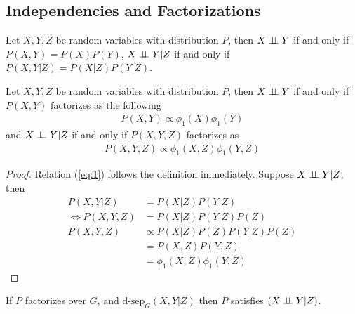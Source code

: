 \documentclass[11pt]{article}
\newcommand{\dsep}[0]{\text{d-sep}}
\newcommand{\pa}[0]{\text{Par}}
\begin{document}
	\subsection{Independencies and Factorizations}
	\begin{definition}
		Let $X, Y, Z$ be random variables with distribution $P$, then $X \perp \!\!\! \perp Y$ if and only if $P(X, Y) = P(X)P(Y)$, $X \perp \!\!\! \perp Y | Z$ if and only if $P(X, Y|Z) = P(X|Z)P(Y|Z)$.
	\end{definition}
	
	\begin{proposition}
		Let $X, Y, Z$ be random variables with distribution $P$, then $X \perp \!\!\! \perp Y$ if and only if $P(X,Y)$ factorizes as the following
		\begin{align}
			P(X, Y) \propto \phi_1(X) \phi_1(Y) \label{eq:1}
		\end{align}
		and $X \perp \!\!\! \perp Y|Z$ if and only if $P(X, Y, Z)$ factorizes as
		\begin{align}
			P(X, Y, Z) \propto \phi_1(X, Z) \phi_1(Y, Z) \label{eq:2}
		\end{align}
		
		\begin{proof}
			Relation (\ref{eq:1}) follows the definition immediately.
			Suppose $X \perp \!\!\! \perp Y|Z$, then
			\begin{align}
				P(X, Y | Z) &= P(X|Z)P(Y|Z) \\
				\iff P(X,Y,Z) &= P(X|Z)P(Y|Z)P(Z) \\
				P(X,Y,Z) &\propto P(X|Z)P(Z)P(Y|Z)P(Z) \\
				&= P(X,Z) P(Y,Z) \\
				&= \phi_1(X, Z) \phi_1(Y, Z)
			\end{align}
		\end{proof}
	\end{proposition}
	
	
	\begin{theorem}
		If $P$ factorizes over $G$, and $\dsep_G(X,Y|Z)$ then $P$ satisfies $(X\perp \!\!\! \perp Y|Z)$.
	\end{theorem}
	
\end{document}
